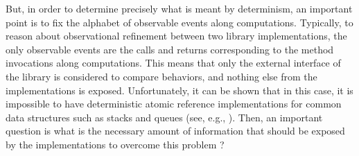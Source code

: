 But, in order to determine precisely what is meant by determinism, an important point is to fix the alphabet of observable events along computations. 
Typically, to reason about observational refinement between two library implementations, the only observable events are the calls and returns corresponding to the method invocations along computations. This means that only the external interface of the library is considered to compare behaviors, and nothing else from the implementations is exposed. Unfortunately, it can be shown that in this case, it is impossible to have deterministic atomic reference implementations for common data structures such as stacks and queues (see, e.g., \cite{DBLP:conf/cav/SchellhornWD12}). Then, an important question is what is the necessary amount of information that should be exposed by the implementations to overcome this problem ?

